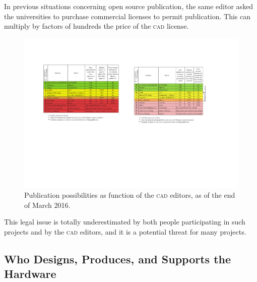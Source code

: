 \documentclass[letterpaper, 10 pt, conference]{ieeeconf}  %
\begin{document}
In previous situations concerning open source publication, the same editor asked the universities to purchase commercial licenses to permit publication.
This can multiply by factors of hundreds the price of the \textsc{cad} license.

\begin{figure}
\centering
\includegraphics[width=\columnwidth]{figures/table}
\caption{Publication possibilities as function of the \textsc{cad} editors, as of the end of March 2016.}
\label{fig:editors}
\end{figure}

This legal issue is totally underestimated by both people participating in such projects and by the \textsc{cad} editors, and it is a potential threat for many projects. 

\subsection{Who Designs, Produces, and Supports the Hardware}
\end{document}
